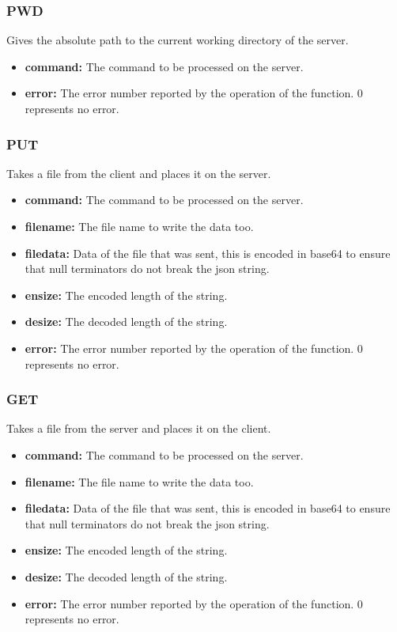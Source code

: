 \documentclass{article}
\begin{document}
\subsubsection{PWD}
Gives the absolute path to the current working directory of the server.
\begin{itemize}
\item \textbf{command:} The command to be processed on the server.
\item \textbf{error:} The error number reported by the operation of the function. 0 represents no error.
\end{itemize}
\subsubsection{PUT}
Takes a file from the client and places it on the server.
\begin{itemize}
\item \textbf{command:} The command to be processed on the server.
\item \textbf{filename:} The file name to write the data too.
\item \textbf{filedata:} Data of the file that was sent, this is encoded in base64 to ensure that null terminators do not break the json string.
\item \textbf{ensize:} The encoded length of the string.
\item \textbf{desize:} The decoded length of the string.
\item \textbf{error:} The error number reported by the operation of the function. 0 represents no error.
\end{itemize}
\subsubsection{GET}
Takes a file from the server and places it on the client.
\begin{itemize}
\item \textbf{command:} The command to be processed on the server.
\item \textbf{filename:} The file name to write the data too.
\item \textbf{filedata:} Data of the file that was sent, this is encoded in base64 to ensure that null terminators do not break the json string.
\item \textbf{ensize:} The encoded length of the string.
\item \textbf{desize:} The decoded length of the string.
\item \textbf{error:} The error number reported by the operation of the function. 0 represents no error.
\end{itemize}
\end{document}
